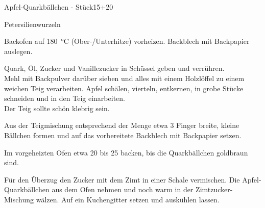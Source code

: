 \begin{MyRecipe}{Apfel-Quarkbällchen}{ -  Stück}{\SI{15}{\minuteprime}+\SI{20}{\minuteprime}}
	
	\ingredient[\Calc{2}{\x}]{} {Petersilienwurzeln}


	Backofen auf \SI{180}{\degreeCelsius} (Ober-/Unterhitze) vorheizen. Backblech mit Backpapier auslegen.
	

	Quark, Öl, Zucker und Vanillezucker in Schüssel geben und verrühren.\\
	Mehl mit Backpulver darüber sieben und alles mit einem Holzlöffel zu einem weichen Teig verarbeiten.
	Apfel schälen, vierteln, entkernen, in grobe Stücke schneiden und in den Teig einarbeiten.\\
	Der Teig sollte schön klebrig sein.\par\bigskip

	Aus der Teigmischung entsprechend der Menge etwa 3 Finger breite, kleine Bällchen formen und auf das vorbereitete Backblech mit Backpapier setzen. \par\bigskip
	
	Im vorgeheizten Ofen etwa  \SI{20}{\minuteprime} bis  \SI{25}{\minuteprime} backen, bis die Quarkbällchen goldbraun sind.\par\bigskip
	

	Für den Überzug den Zucker mit dem Zimt in einer Schale vermischen. Die Apfel-Quarkbällchen aus dem Ofen nehmen und noch warm in der Zimtzucker-Mischung wälzen. Auf ein
	Kuchengitter setzen und auskühlen lassen.

	
	
	
\end{MyRecipe}